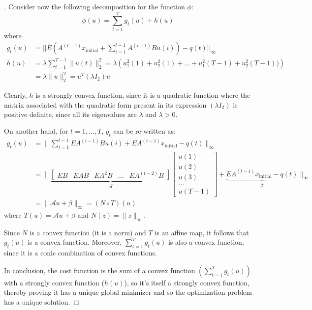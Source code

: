 \documentclass[12pt]{article}
\begin{document}
\begin{proof}[\unskip\nopunct]
Consider now the following decomposition for the function $\phi$:
\[  
    \phi(u) =  \sum_{t=1}^{T} g_t(u) + h(u)
\]
where 
\vspace{-0.5em}
\begin{align*}
    g_t(u) &= ||E (A^{(t-1)} x_{\text{initial}} + \sum_{i=1}^{t-1} A^{(i-1)} B u(i)) - q(t)||_{\infty} \\
    h(u) &= \lambda \sum_{t=1}^{T-1} \|u(t)\|_{2}^2 = 
    \lambda \left( u_1^2(1)+ u_2^2(1) + ... + u_1^2(T - 1)+ u_2^2(T - 1))\right) \\
    &=  \lambda \|u\|_2^2 = u^T (\lambda I_2) u
\end{align*}

Clearly, $h$ is a strongly convex function, since it is a quadratic function where the matrix associated with the quadratic form present in its expression $(\lambda I_2)$ is positive definite, since all its eigenvalues are $\lambda$ and $\lambda > 0$. \par
On another hand, for $t = 1, ..., T$, $g_t$ can be re-written as:
\begin{align*}
    g_t(u) &= \bigg\|\sum_{i=1}^{t-1} EA^{(i-1)} B u(i) + EA^{(t-1)} x_{\text{initial}} - q(t)\bigg\|_{\infty} \\
    &= \bigg\|
    \underbrace{
    \begin{bmatrix}
        EB & EAB & EA^2B & ... & EA^{(t - 2)}B
    \end{bmatrix}
    }_{\mathcal{A}}
    \begin{bmatrix}
        u(1) \\ u(2) \\ u(3) \\ ... \\ u(T - 1)
    \end{bmatrix}
    + \underbrace{EA^{(t-1)} x_{\text{initial}} - q(t)}_{\beta}\bigg\|_{\infty} \\
    &= \| \mathcal{A}u + \beta \|_{\infty} = (N \circ T)(u)
\end{align*}
where $T(u) = \mathcal{A}u + \beta$ and $N(z) = \|z\|_{\infty}$.\par
Since $N$ is a convex function (it is a norm) and $T$ is an affine map, it follows that $g_t(u)$ is a convex function. Moreover, $\sum_{t=1}^{T} g_t(u)$ is also a convex function, since it is a conic combination of convex functions.
\par
In conclusion, the cost function is the sum of a convex function $(\sum_{t=1}^{T} g_t(u))$ with a strongly convex function ($h(u)$), so it's itself a strongly convex function, thereby proving it has a unique global minimizer and so the optimization problem has a unique solution.
\end{proof}
\end{document}
